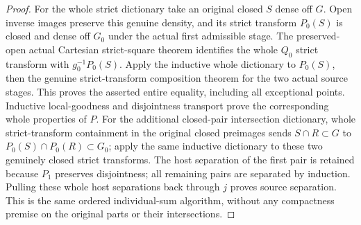 \begin{proof}
For the whole strict dictionary take an original closed $S$ dense off
$G$. Open inverse images preserve this genuine density, and its strict
transform $P_0(S)$ is closed and dense off $G_0$ under the actual first
admissible stage. The preserved-open actual Cartesian strict-square
theorem identifies the whole $Q_0$ strict transform with
$g_0^{-1}P_0(S)$. Apply the inductive whole dictionary to $P_0(S)$, then
the genuine strict-transform composition theorem for the two actual
source stages. This proves the asserted entire equality, including all
exceptional points. Inductive local-goodness and disjointness transport
prove the corresponding whole properties of $P$. For the additional
closed-pair intersection dictionary, whole strict-transform containment
in the original closed preimages sends $S\cap R\subset G$ to
$P_0(S)\cap P_0(R)\subset G_0$; apply the same inductive dictionary
to these two genuinely closed strict transforms. The host separation
of the first pair is retained because $P_1$ preserves disjointness;
all remaining pairs are separated by induction. Pulling these whole
host separations back through $j$ proves source separation. This is the
same ordered individual-sum algorithm, without any compactness premise
on the original parts or their intersections.
\end{proof}
